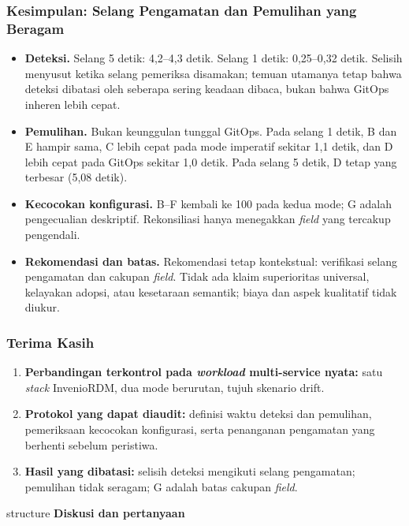{
\usebackgroundtemplate{\backgroundcontent}
\begin{frame}
    \frametitle{Kesimpulan: Selang Pengamatan dan Pemulihan yang Beragam}
    \scriptsize
    \begin{itemize}\setlength{\itemsep}{2pt}
        \item \textbf{Deteksi.} Selang 5 detik: 4,2--4,3 detik. Selang 1 detik: 0,25--0,32 detik. Selisih menyusut ketika selang pemeriksa disamakan; temuan utamanya tetap bahwa deteksi dibatasi oleh seberapa sering keadaan dibaca, bukan bahwa GitOps inheren lebih cepat.
        \item \textbf{Pemulihan.} Bukan keunggulan tunggal GitOps. Pada selang 1 detik, B dan E hampir sama, C lebih cepat pada mode imperatif sekitar 1,1 detik, dan D lebih cepat pada GitOps sekitar 1,0 detik. Pada selang 5 detik, D tetap yang terbesar (5,08 detik).
        \item \textbf{Kecocokan konfigurasi.} B--F kembali ke 100 pada kedua mode; G adalah pengecualian deskriptif. Rekonsiliasi hanya menegakkan \textit{field} yang tercakup pengendali.
        \item \textbf{Rekomendasi dan batas.} Rekomendasi tetap kontekstual: verifikasi selang pengamatan dan cakupan \textit{field}. Tidak ada klaim superioritas universal, kelayakan adopsi, atau kesetaraan semantik; biaya dan aspek kualitatif tidak diukur.
    \end{itemize}
    \vspace{0.04cm}
\end{frame}
}

{
\usebackgroundtemplate{\backgroundcontent}
\begin{frame}
    \frametitle{Terima Kasih}
    \vspace{0.16cm}
    \begin{enumerate}\setlength{\itemsep}{7pt}
        \item \textbf{Perbandingan terkontrol pada \textit{workload} multi-service nyata:} satu \textit{stack} InvenioRDM, dua mode berurutan, tujuh skenario drift.
        \item \textbf{Protokol yang dapat diaudit:} definisi waktu deteksi dan pemulihan, pemeriksaan kecocokan konfigurasi, serta penanganan pengamatan yang berhenti sebelum peristiwa.
        \item \textbf{Hasil yang dibatasi:} selisih deteksi mengikuti selang pengamatan; pemulihan tidak seragam; G adalah batas cakupan \textit{field}.
    \end{enumerate}
    \vspace{0.18cm}
    \begin{beamercolorbox}[wd=0.92\textwidth, sep=0.20cm, center, rounded=true]{structure}
        \normalsize\bfseries Diskusi dan pertanyaan
    \end{beamercolorbox}
\end{frame}
}


